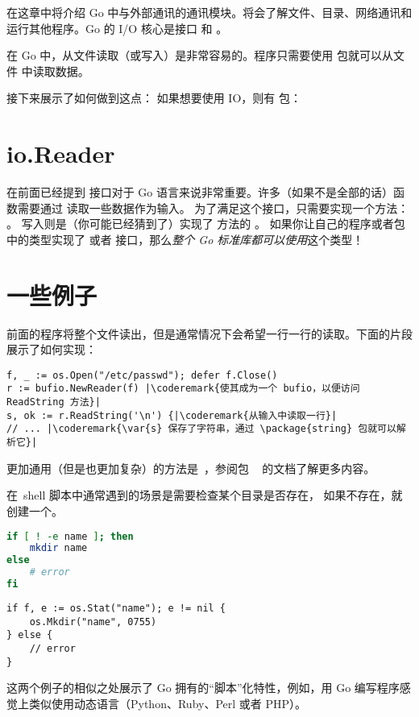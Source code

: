 \noindent{}在这章中将介绍 Go 中与外部通讯的通讯模块。将会了解文件、目录、网络通讯和运行其他程序。Go 的 I/O 核心是接口  和 。

在 Go 中，从文件读取（或写入）是非常容易的。程序只需要使用
 包就可以从文件  中读取数据。

接下来展示了如何做到这点：
\showremarks
如果想要使用 IO，则有
 包：

\showremarks

\section{io.Reader}
在前面已经提到  接口对于 Go 语言来说非常重要。许多（如果不是全部的话）函数需要通过 
 读取一些数据作为输入。
为了满足这个接口，只需要实现一个方法：
。
写入则是（你可能已经猜到了）实现了  方法的 。
如果你让自己的程序或者包中的类型实现了  或者
 接口，那么\emph{整个 Go 标准库都可以使用}这个类型！

\section{一些例子}

前面的程序将整个文件读出，但是通常情况下会希望一行一行的读取。下面的片段展示了如何实现：

\begin{lstlisting}
f, _ := os.Open("/etc/passwd"); defer f.Close()
r := bufio.NewReader(f) |\coderemark{使其成为一个 bufio，以便访问 ReadString 方法}|
s, ok := r.ReadString('\n') {|\coderemark{从输入中读取一行}|
// ... |\coderemark{\var{s} 保存了字符串，通过 \package{string} 包就可以解析它}|
\end{lstlisting}

更加通用（但是也更加复杂）的方法是~，参阅包
~ 的文档了解更多内容。

在~shell 脚本中通常遇到的场景是需要检查某个目录是否存在，
如果不存在，就创建一个。

\begin{minipage}{.5\textwidth}
\begin{lstlisting}[language=sh,caption={用~shell 创建一个目录}]
if [ ! -e name ]; then
    mkdir name
else
    # error
fi
\end{lstlisting}
\end{minipage}
\hspace{1em}
\begin{minipage}{.5\textwidth}
\begin{lstlisting}[caption={用~Go 创建一个目录}]
if f, e := os.Stat("name"); e != nil {
    os.Mkdir("name", 0755)
} else {
    // error
}
\end{lstlisting}
\end{minipage}
这两个例子的相似之处展示了 Go 拥有的``脚本''化特性，例如，用 Go  编写程序感觉上类似使用动态语言（Python、Ruby、Perl 或者 PHP）。

